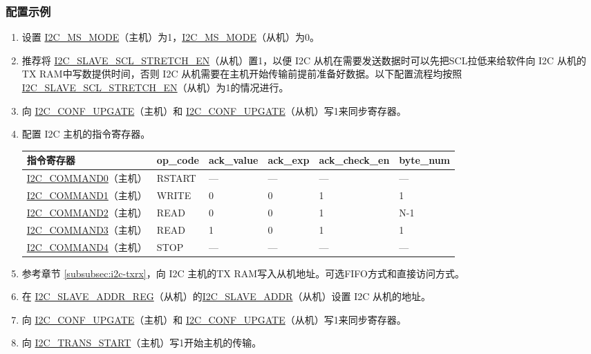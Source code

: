 \documentclass[main\_\_CN.tex]{subfiles}
\begin{document}
\subsubsection{配置示例}
\begin{enumerate}
\item 设置 \hyperref[fielddesc:I2CMSMODE]{I2C\_MS\_MODE}（主机）为1，\hyperref[fielddesc:I2CMSMODE]{I2C\_MS\_MODE}（从机）为0。
\item 推荐将 \hyperref[fielddesc:I2CSLAVESCLSTRETCHEN]{I2C\_SLAVE\_SCL\_STRETCH\_EN}（从机）置1，以便 I2C 从机在需要发送数据时可以先把SCL拉低来给软件向 I2C 从机的TX RAM中写数提供时间，否则 I2C 从机需要在主机开始传输前提前准备好数据。以下配置流程均按照\hyperref[fielddesc:I2CSLAVESCLSTRETCHEN]{I2C\_SLAVE\_SCL\_STRETCH\_EN}（从机）为1的情况进行。 
\item 向 \hyperref[fielddesc:I2CCONFUPGATE]{I2C\_CONF\_UPGATE}（主机）和 \hyperref[fielddesc:I2CCONFUPGATE]{I2C\_CONF\_UPGATE}（从机）写1来同步寄存器。
\item 配置 I2C 主机的指令寄存器。
\begin{longtable}{ | p{4cm} | p{2cm} | p{2cm} | p{2cm} |p{2.2cm} | p{1.8cm} |}
\hline\rowcolor{lightgray}
指令寄存器& op\_code & ack\_value&ack\_exp&ack\_check\_en&byte\_num  \\ \hline
\hyperref[fielddesc:I2CCOMMAND0]{I2C\_COMMAND0}（主机）& RSTART& ---&---&---&---  \\ \hline
\hyperref[fielddesc:I2CCOMMAND1]{I2C\_COMMAND1}（主机）& WRITE& 0&0&1&1  \\ \hline
\hyperref[fielddesc:I2CCOMMAND2]{I2C\_COMMAND2}（主机）& READ& 0&0&1&N-1  \\ \hline
\hyperref[fielddesc:I2CCOMMAND3]{I2C\_COMMAND3}（主机）& READ& 1&0&1&1  \\ \hline
\hyperref[fielddesc:I2CCOMMAND4]{I2C\_COMMAND4}（主机）& STOP& ---&---&---&---  \\ \hline
\end{longtable}
\item 参考章节 \ref{subsubsec:i2c-txrx}，向 I2C 主机的TX RAM写入从机地址。可选FIFO方式和直接访问方式。
\item 在 \hyperref[regdesc:I2CSLAVEADDRREG]{I2C\_SLAVE\_ADDR\_REG}（从机）的\hyperref[fielddesc:I2CSLAVEADDR]{I2C\_SLAVE\_ADDR}（从机）设置 I2C 从机的地址。
\item 向 \hyperref[fielddesc:I2CCONFUPGATE]{I2C\_CONF\_UPGATE}（主机）和 \hyperref[fielddesc:I2CCONFUPGATE]{I2C\_CONF\_UPGATE}（从机）写1来同步寄存器。
\item 向 \hyperref[fielddesc:I2CTRANSSTART]{I2C\_TRANS\_START}（主机）写1开始主机的传输。

\end{enumerate}
\end{document}
